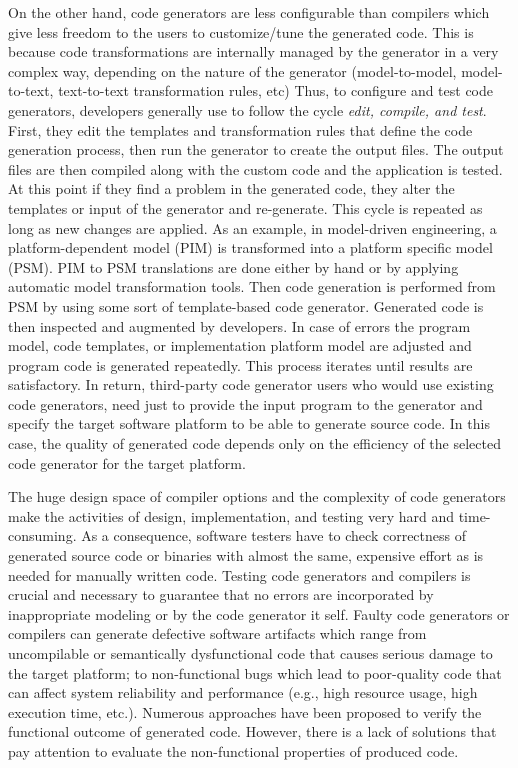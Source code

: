 On the other hand, code generators are less configurable than compilers which give less freedom to the users to customize/tune the generated code. This is because code transformations are internally managed by the generator in a very complex way, depending on the nature of the generator (model-to-model, model-to-text, text-to-text transformation rules, etc)
Thus, to configure and test code generators, developers generally use to follow the cycle \textit{edit, compile, and test}. First, they edit the templates and transformation rules that define the code generation process, then run the generator to create the output files. The output files are then compiled along with the custom code and the application is tested. At this point if they find a problem in the generated code, they alter the templates or input of the generator and re-generate. This cycle is repeated as long as new changes are applied. 
As an example, in model-driven engineering, a platform-dependent model (PIM) is transformed into a platform specific model (PSM). PIM to PSM translations are done either by hand or by applying automatic model transformation tools. Then code generation is performed from PSM by using some sort of template-based code generator. Generated code is then inspected and augmented by developers. In case of errors the program model, code templates, or implementation platform model are adjusted and program code is generated repeatedly\cite{herrington2003code}. This process iterates until results are satisfactory.
In return, third-party code generator users who would use existing code generators, need just to provide the input program to the generator and specify the target software platform to be able to generate source code. In this case, the quality of generated code depends only on the efficiency of the selected code generator for the target platform.

The huge design space of compiler options and the complexity of code generators make the activities of design, implementation, and testing very hard and time-consuming\cite{guana2015developers}. 
As a consequence, software testers have to check correctness of generated source code or binaries with almost the same, expensive effort as is needed for manually written code. 
Testing code generators and compilers is crucial and necessary to guarantee that no errors are incorporated by inappropriate modeling or by the code generator it self. 
Faulty code generators or compilers can generate defective software artifacts which range from uncompilable or semantically dysfunctional code that causes serious damage to the target platform; to non-functional bugs which lead to poor-quality code that can affect system reliability and performance (e.g., high resource usage, high execution time, etc.). 
Numerous approaches have been proposed\cite{stuermer2007systematic,yang2011finding} to verify the functional outcome of generated code. However, there is a lack of solutions that pay attention to evaluate the non-functional properties of produced code.

